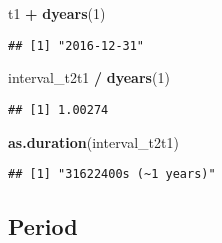 \documentclass[]{memoir}
\newenvironment{Shaded}{\begin{snugshade}}{\end{snugshade}}
\newcommand{\KeywordTok}[1]{\textcolor[rgb]{0.13,0.29,0.53}{\textbf{#1}}}
\newcommand{\DecValTok}[1]{\textcolor[rgb]{0.00,0.00,0.81}{#1}}
\newcommand{\StringTok}[1]{\textcolor[rgb]{0.31,0.60,0.02}{#1}}
\newcommand{\OperatorTok}[1]{\textcolor[rgb]{0.81,0.36,0.00}{\textbf{#1}}}
\newcommand{\NormalTok}[1]{#1}
\begin{document}
\begin{Shaded}
\begin{Highlighting}[]
\NormalTok{t1 }\OperatorTok{+}\StringTok{ }\KeywordTok{dyears}\NormalTok{(}\DecValTok{1}\NormalTok{)}
\end{Highlighting}
\end{Shaded}

\begin{verbatim}
## [1] "2016-12-31"
\end{verbatim}

\begin{Shaded}
\begin{Highlighting}[]
\NormalTok{interval_t2t1 }\OperatorTok{/}\StringTok{ }\KeywordTok{dyears}\NormalTok{(}\DecValTok{1}\NormalTok{)}
\end{Highlighting}
\end{Shaded}

\begin{verbatim}
## [1] 1.00274
\end{verbatim}

\begin{Shaded}
\begin{Highlighting}[]
\KeywordTok{as.duration}\NormalTok{(interval_t2t1)}
\end{Highlighting}
\end{Shaded}

\begin{verbatim}
## [1] "31622400s (~1 years)"
\end{verbatim}

\subsection{Period}\label{period}
\end{document}

